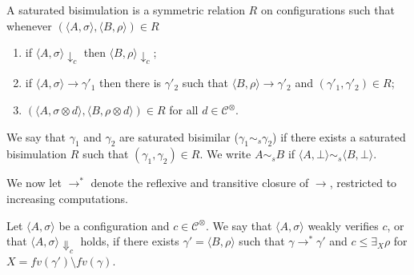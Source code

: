 \documentclass[main.tex]{subfiles}
\begin{document}
\begin{definition}\label{def:strongsb} A saturated bisimulation is a symmetric relation $R$ on configurations such that whenever
$( \langle A, \sigma \rangle,\langle B, \rho \rangle) \in R$
\begin{enumerate}
\item if $\langle A, \sigma \rangle \downarrow_c$ then $\langle B, \rho \rangle \downarrow_c$;
\item if $\langle A, \sigma \rangle \longrightarrow \gamma'_1$ then there is $\gamma'_2$ such that $\langle B, \rho \rangle \longrightarrow \gamma'_2$ and $(\gamma'_1, \gamma'_2) \in R$;
\item $(\langle A,\sigma \otimes d\rangle, \langle B,\rho \otimes d \rangle) \in R$ for  all $d \in \mathcal{C}^\otimes$.
\end{enumerate}
We say that $\gamma_1$ and $\gamma_2$ are  saturated bisimilar ($\gamma_1  \sim_{\mathit{s}} \gamma_2$) if there exists a  saturated  bisimulation $R$ such that $(\gamma_1 , \gamma_2 ) \in R$. We write $A \sim_{\mathit{s}} B$ if $\langle A, \bot\rangle \sim_{\mathit{s}} \langle B, \bot \rangle$.
\end{definition}

We now let $\longrightarrow^*$ denote the reflexive and transitive closure of $\longrightarrow$, restricted to increasing computations.

\begin{definition} 
Let $\langle A, \sigma \rangle$ be a configuration and $c \in \mathcal{C}^\otimes$.
We say that $\langle A, \sigma \rangle$ weakly verifies $c$, or that $\langle A, \sigma \rangle \Downarrow_c$ holds, 
if  there exists $\gamma' = \langle B, \rho \rangle$ such that 
$\gamma \longrightarrow^* \gamma'$ and $c \leq \exists_{X} \rho$ for $X = fv(\gamma') \setminus fv(\gamma)$.
\end{definition}
\end{document}

